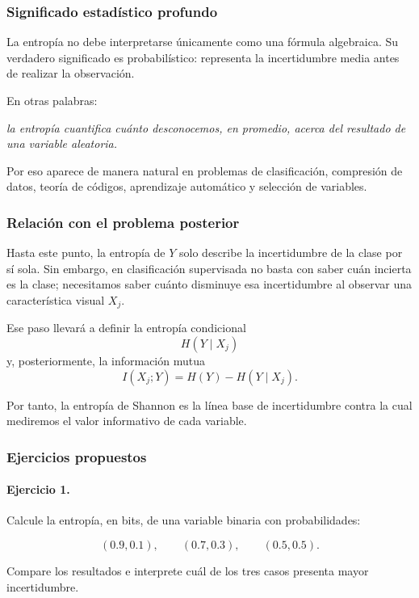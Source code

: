 \documentclass{article}
\begin{document}
\subsubsection*{Significado estadístico profundo}

La entropía no debe interpretarse únicamente como una fórmula algebraica. Su verdadero significado es probabilístico: representa la incertidumbre media antes de realizar la observación.

En otras palabras:

\begin{center}
\emph{la entropía cuantifica cuánto desconocemos, en promedio, acerca del resultado de una variable aleatoria.}
\end{center}

Por eso aparece de manera natural en problemas de clasificación, compresión de datos, teoría de códigos, aprendizaje automático y selección de variables.

\subsubsection*{Relación con el problema posterior}

Hasta este punto, la entropía de \(Y\) solo describe la incertidumbre de la clase por sí sola. Sin embargo, en clasificación supervisada no basta con saber cuán incierta es la clase; necesitamos saber cuánto disminuye esa incertidumbre al observar una característica visual \(X_j\).

Ese paso llevará a definir la entropía condicional
\[
H(Y\mid X_j)
\]
y, posteriormente, la información mutua
\[
I(X_j;Y)=H(Y)-H(Y\mid X_j).
\]

Por tanto, la entropía de Shannon es la línea base de incertidumbre contra la cual mediremos el valor informativo de cada variable.

\subsubsection*{Ejercicios propuestos}

\paragraph{Ejercicio 1.}
Calcule la entropía, en bits, de una variable binaria con probabilidades:

\[
(0.9,0.1),\qquad (0.7,0.3),\qquad (0.5,0.5).
\]

Compare los resultados e interprete cuál de los tres casos presenta mayor incertidumbre.
\end{document}
